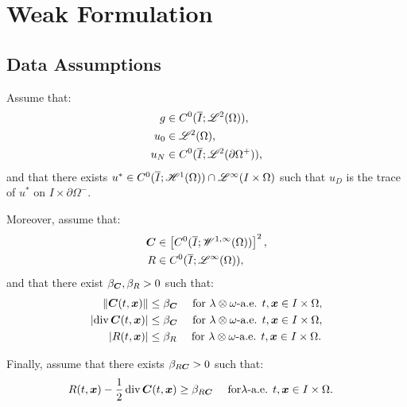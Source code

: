 \newpage
\section{Weak Formulation}

\subsection{Data Assumptions} \label{assumptions}

Assume that:
\begin{align}
    g & \in C^0(\overline{I}; \mathscr{L}^{2}(\Omega)), \\
    u_0 & \in \mathscr{L}^{2}(\Omega), \\
    u_N & \in C^0(\overline{I}; \mathscr{L}^{2}(\partial \Omega^+)),
\end{align}
and that there exists $u^* \in C^0(\overline{I}; \mathscr{H}^{1}(\Omega)) \cap \mathscr{L}^{\infty}(I \times \Omega)$ such that $u_D$ is the trace of $u^*$ on $I \times \partial \Omega^-$.

Moreover, assume that:
\begin{align}
    \bm{C} & \in \left[ C^0(\overline{I}; \mathscr{W}^{1, \infty}(\Omega)) \right]^2, \\
    R & \in C^0(\overline{I}; \mathscr{L}^{\infty}(\Omega)),
\end{align}
and that there exist $\beta_{\bm{C}}, \beta_{R} > 0$ such that:
\begin{align}
    \lVert \bm{C}(t, \bm{x}) \rVert & \leq \beta_{\bm{C}} \quad \text{ for } \lambda \otimes \omega \text{-a.e. } t, \bm{x} \in I \times \Omega, \\
    \lvert \operatorname*{div} \bm{C}(t, \bm{x}) \rvert & \leq \beta_{\bm{C}} \quad \text{ for } \lambda \otimes \omega \text{-a.e. } t, \bm{x} \in I \times \Omega, \\
    \lvert R(t, \bm{x}) \rvert & \leq \beta_{R} \quad \text{ for } \lambda \otimes \omega \text{-a.e. } t, \bm{x} \in I \times \Omega.
\end{align}

Finally, assume that there exists $\beta_{R \bm{C}} > 0$ such that:
\begin{align}
    R(t, \bm{x}) - \frac{1}{2} \operatorname*{div} \bm{C}(t, \bm{x}) & \geq \beta_{R \bm{C}} \quad \text{ for} \lambda \text{-a.e. } t, \bm{x} \in I \times \Omega.
\end{align}

